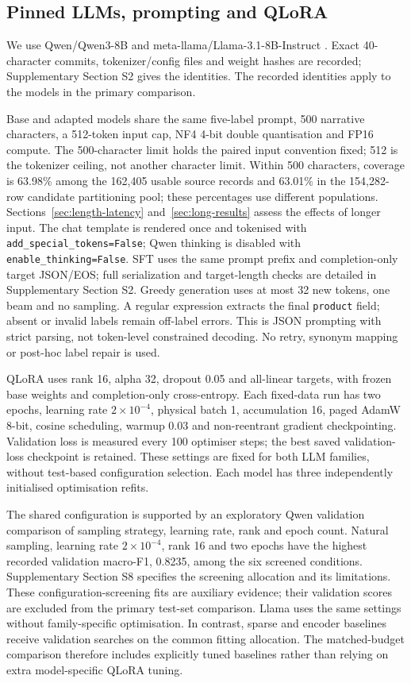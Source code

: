 \documentclass{elektr}
\begin{document}
\subsection{Pinned LLMs, prompting and QLoRA}
\label{sec:llm}
We use Qwen/Qwen3-8B \cite{yang2025qwen3} and meta-llama/Llama-3.1-8B-Instruct \cite{dubey2024llama}. Exact 40-character commits, tokenizer/config files and weight hashes are recorded; Supplementary Section S2 gives the identities. The recorded identities apply to the models in the primary comparison.

Base and adapted models share the same five-label prompt, 500 narrative characters, a 512-token input cap, NF4 4-bit double quantisation and FP16 compute. The 500-character limit holds the paired input convention fixed; 512 is the tokenizer ceiling, not another character limit. Within 500 characters, coverage is 63.98\% among the 162,405 usable source records and 63.01\% in the 154,282-row candidate partitioning pool; these percentages use different populations. Sections~\ref{sec:length-latency} and~\ref{sec:long-results} assess the effects of longer input. The chat template is rendered once and tokenised with \texttt{add\_special\_tokens=False}; Qwen thinking is disabled with \texttt{enable\_thinking=False}. SFT uses the same prompt prefix and completion-only target JSON/EOS; full serialization and target-length checks are detailed in Supplementary Section S2. Greedy generation uses at most 32 new tokens, one beam and no sampling. A regular expression extracts the final \texttt{product} field; absent or invalid labels remain off-label errors. This is JSON prompting with strict parsing, not token-level constrained decoding. No retry, synonym mapping or post-hoc label repair is used.

QLoRA uses rank 16, alpha 32, dropout 0.05 and all-linear targets, with frozen base weights and completion-only cross-entropy. Each fixed-data run has two epochs, learning rate $2\times10^{-4}$, physical batch 1, accumulation 16, paged AdamW 8-bit, cosine scheduling, warmup 0.03 and non-reentrant gradient checkpointing. Validation loss is measured every 100 optimiser steps; the best saved validation-loss checkpoint is retained. These settings are fixed for both LLM families, without test-based configuration selection. Each model has three independently initialised optimisation refits.

The shared configuration is supported by an exploratory Qwen validation comparison of sampling strategy, learning rate, rank and epoch count. Natural sampling, learning rate $2\times10^{-4}$, rank 16 and two epochs have the highest recorded validation macro-F1, 0.8235, among the six screened conditions. Supplementary Section S8 specifies the screening allocation and its limitations. These configuration-screening fits are auxiliary evidence; their validation scores are excluded from the primary test-set comparison. Llama uses the same settings without family-specific optimisation. In contrast, sparse and encoder baselines receive validation searches on the common fitting allocation. The matched-budget comparison therefore includes explicitly tuned baselines rather than relying on extra model-specific QLoRA tuning.
\end{document}
